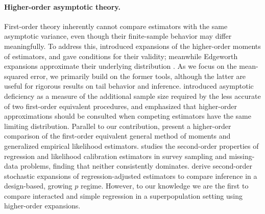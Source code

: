 \documentclass{article}
\theoremstyle{plain}
\theoremstyle{definition}
\theoremstyle{remark}
\begin{document}
\paragraph{Higher-order asymptotic theory.}
First-order theory inherently cannot compare estimators with the same asymptotic variance, even though their finite-sample behavior may differ meaningfully. To address this, \citet{Nagar1959} introduced expansions of the higher-order moments of estimators, and \citet{Sargan1974} gave conditions for their validity; meanwhile Edgeworth expansions approximate their underlying distribution \citep{Sargan1976,BhattacharyaRao1976,Hall1992,Ghosh1994}. As we focus on the mean-squared error, we primarily build on the former tools, although the latter are useful for rigorous results on tail behavior and inference. \citet{HodgesLehmann1970} introduced asymptotic deficiency as a measure of the additional sample size required by the less accurate of two first-order equivalent procedures, and \citet{Rothenberg1984} emphasized that higher-order approximations should be consulted when competing estimators have the same limiting distribution. Parallel to our contribution, \citet{NeweySmith2004} present a higher-order comparison of the first-order equivalent general method of moments and generalized empirical likelihood estimators. \citet{Tan2014} studies the second-order properties of regression and likelihood calibration estimators in survey sampling and missing-data problems, finding that neither consistently dominates. \citet{ChiangMatsushitaOtsu2026} derive second-order stochastic expansions of regression-adjusted estimators to compare inference in a design-based, growing $p$ regime. However, to our knowledge we are the first to compare interacted and simple regression in a superpopulation setting using higher-order expansions.
 
\end{document}
